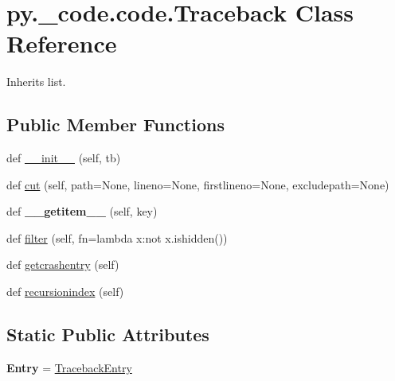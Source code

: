 \hypertarget{classpy_1_1__code_1_1code_1_1_traceback}{}\section{py.\+\_\+code.\+code.\+Traceback Class Reference}
\label{classpy_1_1__code_1_1code_1_1_traceback}


Inherits list.

\subsection*{Public Member Functions}
\begin{DoxyCompactItemize}
\item 
def \hyperlink{classpy_1_1__code_1_1code_1_1_traceback_aea2d1409a245794eca62d80884520590}{\+\_\+\+\_\+init\+\_\+\+\_\+} (self, tb)
\item 
def \hyperlink{classpy_1_1__code_1_1code_1_1_traceback_a71ca463717ecf011836e62ad25db4a73}{cut} (self, path=None, lineno=None, firstlineno=None, excludepath=None)
\item 
\mbox{\label{classpy_1_1__code_1_1code_1_1_traceback_a249c44a92667062bfc6d67044489849b}} 
def {\bfseries \+\_\+\+\_\+getitem\+\_\+\+\_\+} (self, key)
\item 
def \hyperlink{classpy_1_1__code_1_1code_1_1_traceback_a07aee95114669d9e65fef873c163553c}{filter} (self, fn=lambda x\+:not x.\+ishidden())
\item 
def \hyperlink{classpy_1_1__code_1_1code_1_1_traceback_a9f0df5e06aa6de5e065fbc83c1efc7f8}{getcrashentry} (self)
\item 
def \hyperlink{classpy_1_1__code_1_1code_1_1_traceback_a282dee22b5c7c04e9be93bad6079b561}{recursionindex} (self)
\end{DoxyCompactItemize}
\subsection*{Static Public Attributes}
\begin{DoxyCompactItemize}
\item 
\mbox{\label{classpy_1_1__code_1_1code_1_1_traceback_a1054c4d8486a88cf8e3c69d38798828c}} 
{\bfseries Entry} = \hyperlink{classpy_1_1__code_1_1code_1_1_traceback_entry}{Traceback\+Entry}
\end{DoxyCompactItemize}


